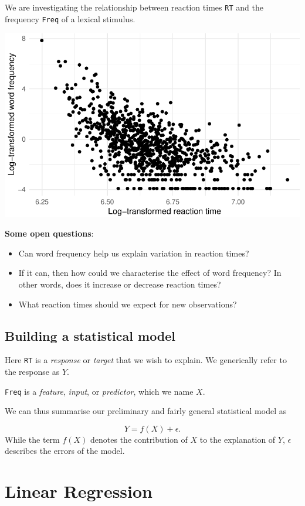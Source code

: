 \documentclass[
  11pt,
  letterpaper,
  DIV=11,
  numbers=noendperiod]{scrreprt}
\begin{document}
We are investigating the relationship between reaction times \texttt{RT}
and the frequency \texttt{Freq} of a lexical stimulus.

\includegraphics{Linear_regression_files/figure-pdf/unnamed-chunk-5-1.pdf}

\textbf{Some open questions}:

\begin{itemize}
\item
  Can word frequency help us explain variation in reaction times?
\item
  If it can, then how could we characterise the effect of word
  frequency? In other words, does it increase or decrease reaction
  times?
\item
  What reaction times should we expect for new observations?
\end{itemize}

\subsection{Building a statistical
model}\label{building-a-statistical-model}

Here \texttt{RT} is a \emph{response} or \emph{target} that we wish to
explain. We generically refer to the response as \(Y\).

\texttt{Freq} is a \emph{feature}, \emph{input}, or \emph{predictor},
which we name \(X\).

We can thus summarise our preliminary and fairly general statistical
model as

\[ Y = f(X) + \epsilon. \]While the term \(f(X)\) denotes the
contribution of \(X\) to the explanation of \(Y\), \(\epsilon\)
describes the errors of the model.

\section{Linear Regression}\label{linear-regression-1}
\end{document}
